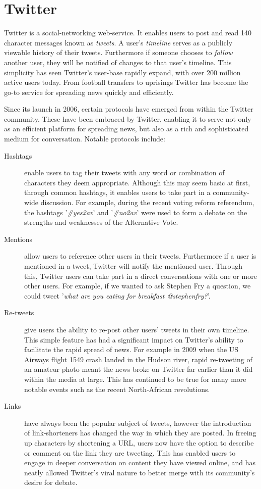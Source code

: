 \section{Twitter}
\label{background:twitter}

Twitter is a social-networking web-service. It enables users to post and read 140 character messages known as \emph{tweets}. A user's \emph{timeline} serves as a publicly viewable history of their tweets. Furthermore if someone chooses to \emph{follow} another user, they will be notified of changes to that user's timeline. This simplicity has seen Twitter's user-base rapidly expand, with over 200 million active users today. From football transfers to uprisings Twitter has become the go-to service for spreading news quickly and efficiently.

Since its launch in 2006, certain protocols have emerged from within the Twitter community. These have been embraced by Twitter, enabling it to serve not only as an efficient platform for spreading news, but also as a rich and sophisticated medium for conversation. Notable protocols include:

\begin{description}
	\item [Hashtags] enable users to tag their tweets with any word or combination of characters they deem appropriate. Although this may seem basic at first, through common hashtags, it enables users to take part in a community-wide discussion. For example, during the recent voting reform referendum, the hashtags '\emph{\#yes2av}' and '\emph{\#no2av}' were used to form a debate on the strengths and weaknesses of the Alternative Vote. 
	\item [Mentions] allow users to reference other users in their tweets. Furthermore if a user is mentioned in a tweet, Twitter will notify the mentioned user. Through this, Twitter users can take part in a direct conversations with one or more other users. For example, if we wanted to ask Stephen Fry a question, we could tweet '\emph{what are you eating for breakfast @stephenfry?}'.
	\item [Re-tweets] give users the ability to re-post other users' tweets in their own timeline. This simple feature has had a significant impact on Twitter's ability to facilitate the rapid spread of news. For example in 2009 when the US Airways flight 1549 crash landed in the Hudson river, rapid re-tweeting of an amateur photo meant the news broke on Twitter far earlier than it did within the media at large. This has continued to be true for many more notable events such as the recent North-African revolutions.
	\item [Links] have always been the popular subject of tweets, however the introduction of link-shorteners has changed the way in which they are posted. In freeing up characters by shortening a URL, users now have the option to describe or comment on the link they are tweeting. This has enabled users to engage in deeper conversation on content they have viewed online, and has neatly allowed Twitter's viral nature to better merge with its community's desire for debate.
\end{description}

